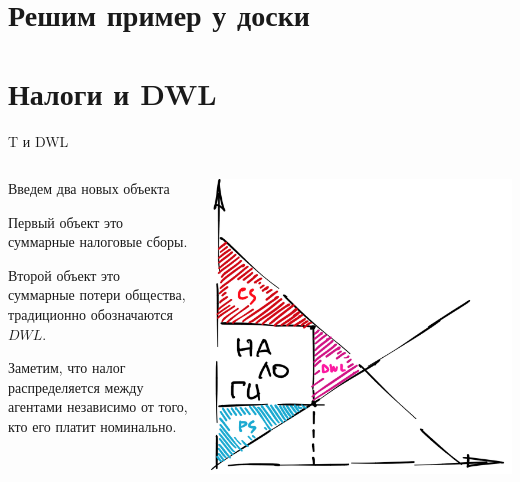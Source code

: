 \documentclass{beamer}
\begin{document}
\section{Решим пример у доски}

\section{Налоги и DWL}

\begin{frame}{T и DWL}
\begin{columns}
\begin{column}{0.5\textwidth}
   Введем два новых объекта
   
   \medskip
   
   Первый объект это суммарные налоговые сборы.
   
   \medskip
   
   Второй объект это суммарные потери общества, традиционно обозначаются $DWL$.
   
   \medskip
   
   Заметим, что налог распределяется между агентами независимо от того, кто его платит номинально.
   
\end{column}
\begin{column}{0.5\textwidth}  %
    \begin{center}
     \includegraphics[width=1\textwidth]{taxesDWL}
     \end{center}
\end{column}
\end{columns}
\end{frame}
\end{document}
